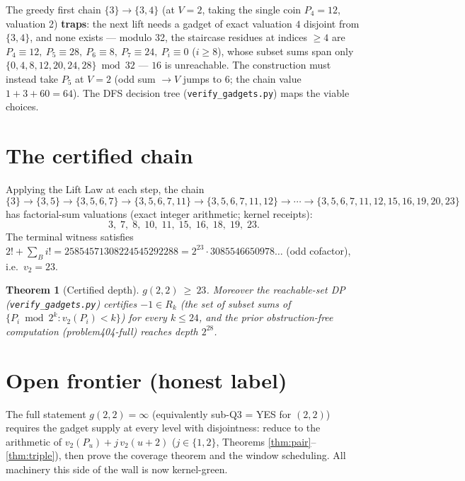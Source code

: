 \documentclass[11pt]{article}
\newtheorem{theorem}{Theorem}
\begin{document}
The greedy first chain $\{3\}\to\{3,4\}$ (at $V=2$, taking the single coin
$P_4=12$, valuation 2) \textbf{traps}: the next lift needs a gadget of
exact valuation $4$ disjoint from $\{3,4\}$, and none exists --- modulo 32,
the staircase residues at indices $\ge 4$ are
$P_4\equiv 12,\ P_5\equiv 28,\ P_6\equiv 8,\ P_7\equiv 24,\ P_i\equiv 0$
($i\ge 8$), whose subset sums span only
$\{0,4,8,12,20,24,28\}\bmod 32$ --- $16$ is unreachable. The construction
must instead take $P_5$ at $V=2$ (odd sum $\to V$ jumps to $6$; the chain
value $1+3+60=64$). The DFS decision tree
(\texttt{verify\_gadgets.py}) maps the viable choices.

\section{The certified chain}

Applying the Lift Law at each step, the chain
\[
\{3\}\to\{3,5\}\to\{3,5,6,7\}\to\{3,5,6,7,11\}\to
\{3,5,6,7,11,12\}\to\cdots\to\{3,5,6,7,11,12,15,16,19,20,23\}
\]
has factorial-sum valuations (exact integer arithmetic; kernel receipts):
\[
3,\;7,\;8,\;10,\;11,\;15,\;16,\;18,\;19,\;23 .
\]
The terminal witness satisfies
$2!+\sum_B i! = 25854571308224545292288 = 2^{23}\cdot 3085546650978\ldots$
(odd cofactor), i.e.\ $v_2 = 23$.

\begin{theorem}[Certified depth]
$g(2,2)\ \ge\ 23$. Moreover the reachable-set DP
(\texttt{verify\_gadgets.py}) certifies $-1\in R_k$ (the set of subset sums
of $\{P_i \bmod 2^k : v_2(P_i)<k\}$) for every $k\le 24$, and the prior
obstruction-free computation (problem404-full) reaches depth $2^{28}$.
\end{theorem}

\section{Open frontier (honest label)}

The full statement $g(2,2)=\infty$ (equivalently sub-Q3 = YES for
$(2,2)$) requires the gadget supply at every level with disjointness:
reduce to the arithmetic of $v_2(P_u)+j\,v_2(u+2)$ ($j\in\{1,2\}$, Theorems
\ref{thm:pair}--\ref{thm:triple}), then prove the coverage theorem and the
window scheduling. All machinery this side of the wall is now kernel-green.
\end{document}

